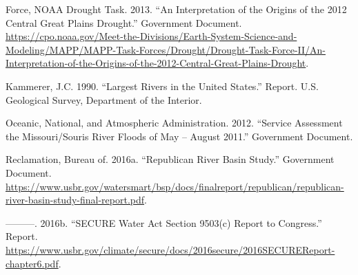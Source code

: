 \documentclass[12pt,]{article}
\begin{document}
\leavevmode\hypertarget{ref-noaa2013}{}%
Force, NOAA Drought Task. 2013. ``An Interpretation of the Origins of
the 2012 Central Great Plains Drought.'' Government Document.
\url{https://cpo.noaa.gov/Meet-the-Divisions/Earth-System-Science-and-Modeling/MAPP/MAPP-Task-Forces/Drought/Drought-Task-Force-II/An-Interpretation-of-the-Origins-of-the-2012-Central-Great-Plains-Drought}.

\leavevmode\hypertarget{ref-kammerer1990}{}%
Kammerer, J.C. 1990. ``Largest Rivers in the United States.'' Report.
U.S. Geological Survey, Department of the Interior.

\leavevmode\hypertarget{ref-noaa2012}{}%
Oceanic, National, and Atmospheric Administration. 2012. ``Service
Assessment the Missouri/Souris River Floods of May -- August 2011.''
Government Document.

\leavevmode\hypertarget{ref-bor2016-2}{}%
Reclamation, Bureau of. 2016a. ``Republican River Basin Study.''
Government Document.
\url{https://www.usbr.gov/watersmart/bsp/docs/finalreport/republican/republican-river-basin-study-final-report.pdf}.

\leavevmode\hypertarget{ref-bor2016-1}{}%
---------. 2016b. ``SECURE Water Act Section 9503(c) Report to
Congress.'' Report.
\url{https://www.usbr.gov/climate/secure/docs/2016secure/2016SECUREReport-chapter6.pdf}.
\end{document}
